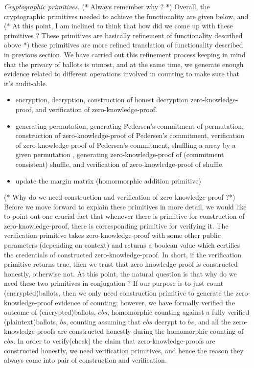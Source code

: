 \documentclass{llncs}
\begin{document}
\smallskip\noindent\emph{Cryptographic primitives.}
(* Always remember why ? *) 
 Overall, the cryptographic primitives needed to achieve the functionality
 are given below, and (* At this point, I am inclined to think that how did 
 we come up with these primitives ? These primitives are basically 
 refinement of functionality described above *) these primitives
 are more refined translation of functionality
 described in previous section. We have carried out this refinement process
 keeping in mind that the privacy of ballots is utmost,
 and at the same time, we generate enough evidence related to different 
 operations involved in counting to make sure that it's audit-able. 
 
\begin{itemize} 
\item encryption, decryption, construction of honest decryption
     zero-knowledge-proof, and verification of zero-knowledge-proof. 
\item generating permutation, generating  Pedersen's 
     commitment \cite{Pederson} of permutation, construction of 
     zero-knowledge-proof of Pedersen's commitment, verification of 
     zero-knowledge-proof of Pedersen's commitment, shuffling a array 
     by a given permutation \cite{Wikstrom:2009:CPS}, 
     generating zero-knowledge-proof of (commitment consistent) shuffle, 
     and verification of zero-knowledge-proof of shuffle.
\item  update the margin matrix (homormorphic addition primitive)
\end{itemize}
  
(* Why do we need construction and verification of zero-knowledge-proof ?*)
Before we move forward to explain these primitives in more detail,
we would like to point out one crucial fact that  whenever 
there is primitive for construction of zero-knowledge-proof, 
there is corresponding primitive for verifying it. 
The verification primitive takes zero-knowledge-proof with some 
other public parameters (depending on context) 
and returns a boolean value which certifies the credentials of constructed 
zero-knowledge-proof. In short, if the verification primitive returns 
true, then we trust that zero-knowledge-proof is constructed honestly, 
otherwise not. At this point, the natural question is that
why do we need these two primitives in conjugation ? If our purpose 
is to just count (encrypted)ballots, then we only need 
construction primitive
to generate the zero-knowledge-proof evidence of counting; however, 
we have formally verified the outcome of (encrypted)ballots, $ebs$, 
homomorphic counting against 
a fully verified (plaintext)ballots, $bs$, counting\cite{Pattinson:2017:SVE}
assuming that $ebs$ decrypt to $bs$, 
and all the zero-knowledge-proofs are constructed honestly during the 
homomorphic counting of $ebs$.
In order to verify(check) the claim that zero-knowledge-proofs are constructed 
honestly, we need verification primitives, and hence the reason they 
always come into pair of construction and verification. 
\end{document}
